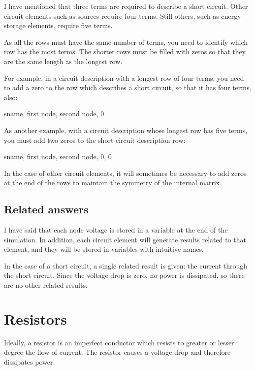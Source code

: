 I have mentioned that three terms are required to describe a short
circuit. Other circuit elements such as sources require four terms.
Still others, such as energy storage elements, require five terms.

As all the rows must have the same number of terms, you need to
identify which row has the most terms. The shorter rows must be
filled with zeros so that they are the same length as the longest
row.

For example, in a circuit description with a longest row of four
terms, you need to add a zero to the row which describes a short
circuit, so that it has four terms, also:

\begin{entry}
sname, first node, second node, 0
\end{entry}

As another example, with a circuit description whose longest row has
five terms, you must add two zeros to the short circuit description
row:

\begin{entry}
sname, first node, second node, 0, 0
\end{entry}

In the case of other circuit elements, it will sometimes be
necessary to add zeros at the end of the rows to maintain the
symmetry of the internal matrix.

\subsection{Related answers}

I have said that each node voltage is stored in a variable at the
end of the simulation. In addition, each circuit element will
generate results related to that element, and they will be stored in
variables with intuitive names.

In the case of a short circuit, a single related result is given:
the current through the short circuit. Since the voltage drop is
zero, no power is dissipated, so there are no other related results.

\section{Resistors}

Ideally, a resistor is an imperfect conductor which resists to
greater or lesser degree the flow of current. The resistor causes a
voltage drop and therefore dissipates power.

